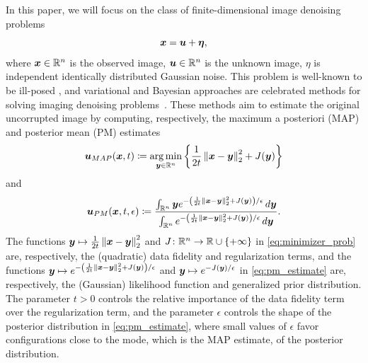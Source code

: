 In this paper, we will focus on the class of finite-dimensional image denoising problems
\begin{equation} \label{eq:image_formation_model}
    \bx = \bu + \boldsymbol{\eta}, %
\end{equation}
where $\boldsymbol{x} \in \mathbb{R}^n$ is the observed image, $\boldsymbol{u} \in \mathbb{R}^n$ is the unknown image, $\eta$ is independent identically distributed Gaussian noise. This problem is well-known to be ill-posed \cite{aubert2006mathematical,demoment1989image,winkler2003image}, and variational and Bayesian approaches are celebrated methods for solving imaging denoising problems~\cite{aubert2006mathematical,demoment1989image,winkler2003image}. These methods aim to estimate the original uncorrupted image by computing, respectively, the maximum a posteriori (MAP) and posterior mean (PM) estimates
\begin{equation} \label{eq:minimizer_prob}
\boldsymbol{u}_{MAP}(\boldsymbol{x},t) \coloneqq \operatorname*{arg\,min}_{\boldsymbol{y}\in\mathbb{R}^n}\left\{ \frac{1}{2t}\left\Vert{\boldsymbol{x}-\boldsymbol{y}} \right\Vert_{2}^{2}+J(\boldsymbol{y})\right\}
\end{equation}
and
\begin{equation} \label{eq:pm_estimate}
    \boldsymbol{u}_{PM}(\boldsymbol{x},t,\epsilon) \coloneqq \frac{\int_{\mathbb{R}^n} \boldsymbol{y} e^{-\left(\frac{1}{2t}\left\Vert{\boldsymbol{x}-\boldsymbol{y}} \right\Vert_{2}^{2} + J(\boldsymbol{y})\right)/\epsilon} \mathop{}\!d\boldsymbol{y}}{\int_{\mathbb{R}^n} e^{-\left(\frac{1}{2t}\left\Vert{\boldsymbol{x}-\boldsymbol{y}} \right\Vert_{2}^{2} + J(\boldsymbol{y})\right)/\epsilon} \mathop{}\!d\boldsymbol{y}}.
\end{equation}
The functions $\boldsymbol{y}\mapsto \frac{1}{2t}\left\Vert{\boldsymbol{x}-\boldsymbol{y}} \right\Vert_{2}^{2}$ and $J\colon\mathbb{R}^n\to\mathbb{R}\cup\{+\infty\}$ in \eqref{eq:minimizer_prob} are, respectively, the (quadratic) data fidelity and regularization terms, and the functions $\boldsymbol{y} \mapsto e^{-\left(\frac{1}{2t}\left\Vert{\boldsymbol{x}-\boldsymbol{y}} \right\Vert_{2}^{2} + J(\boldsymbol{y})\right)/\epsilon}$ and $\boldsymbol{y} \mapsto e^{-J(\boldsymbol{y})/\epsilon}$ in \eqref{eq:pm_estimate} are, respectively, the (Gaussian) likelihood function and generalized prior distribution. The parameter $t>0$ controls the relative importance of the data fidelity term over the regularization term, and the parameter $\epsilon$ controls the shape of the posterior distribution in \eqref{eq:pm_estimate}, where small values of $\epsilon$ favor configurations close to the mode, which is the MAP estimate, of the posterior distribution.

